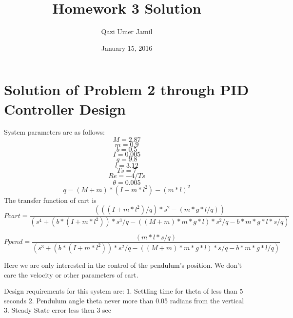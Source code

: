 \documentclass{article}
\title{Homework 3 Solution}
\author{Qazi Umer Jamil }
\date{January 15, 2016}
\begin{document}
\maketitle

\section{Solution of Problem 2 through PID Controller Design}

System parameters are as follows:
\[M = 2.87\]
\[m = 0.9\]
\[b = 0.5\]
\[I = 0.005\]
\[g = 9.8\]
\[l = 3.12\]
\[Ts = 7\]
\[Re = -4/Ts\]
\[\theta = 0.005\]
\[q = (M+m)*(I+m*l^2)-(m*l)^2\]
The transfer function of cart is
\[Pcart = \frac{(((I+m*l^2)/q)*s^2 - (m*g*l/q))}{(s^4 + (b*(I + m*l^2))*s^3/q - ((M + m)*m*g*l)*s^2/q - b*m*g*l*s/q)} \]

\[Ppend = \frac{(m*l*s/q)}{(s^3 + (b*(I + m*l^2))*s^2/q - ((M + m)*m*g*l)*s/q - b*m*g*l/q)} \]

Here we are only interested in the control of the pendulum's position. We don't care the velocity or other parameters of cart.

Design requirements for this system are:
1. Settling time for theta of less than 5 seconds
2. Pendulum angle theta never more than 0.05 radians from the vertical
3. Steady State error less then 3 sec
\end{document}
